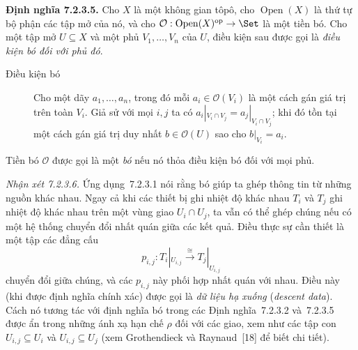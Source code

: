 \noindent\textbf{Định nghĩa 7.2.3.5.}\keepwithnext
Cho $X$ là một không gian tôpô, cho $\operatorname{Open}(X)$ là thứ tự bộ phận các tập mở của nó, và cho $\mathcal O:\operatorname{Open}(X)^{\mathrm{op}}\to\Set$ là một tiền bó. Cho một tập mở $U\subseteq X$ và một phủ $V_1,\ldots,V_n$ của $U$, điều kiện sau được gọi là \emph{điều kiện bó đối với phủ đó}.
\begin{description}
\item[Điều kiện bó] Cho một dãy $a_1,\ldots,a_n$, trong đó mỗi $a_i\in\mathcal O(V_i)$ là một cách gán giá trị trên toàn $V_i$. Giả sử với mọi $i,j$ ta có $a_i|_{V_i\cap V_j}=a_j|_{V_i\cap V_j}$; khi đó tồn tại một cách gán giá trị duy nhất $b\in\mathcal O(U)$ sao cho $b|_{V_i}=a_i$.
\end{description}
Tiền bó $\mathcal O$ được gọi là một \emph{bó} nếu nó thỏa điều kiện bó đối với mọi phủ.

\noindent\textit{Nhận xét 7.2.3.6.}\keepwithnext
Ứng dụng~7.2.3.1 nói rằng bó giúp ta ghép thông tin từ những nguồn khác nhau. Ngay cả khi các thiết bị ghi nhiệt độ khác nhau $T_i$ và $T_j$ ghi nhiệt độ khác nhau trên một vùng giao $U_i\cap U_j$, ta vẫn có thể ghép chúng nếu có một hệ thống chuyển đổi nhất quán giữa các kết quả. Điều thực sự
cần thiết là một tập các đẳng cấu
\[
p_{i,j}:T_i|_{U_{i,j}}\xrightarrow{\cong}T_j|_{U_{i,j}}
\]
chuyển đổi giữa chúng, và các $p_{i,j}$ này phối hợp nhất quán với nhau. Điều này (khi được định nghĩa chính xác) được gọi là \emph{dữ liệu hạ xuống} (\emph{descent data}). Cách nó tương tác với định nghĩa bó trong các Định nghĩa~7.2.3.2 và~7.2.3.5 được ẩn trong những ánh xạ hạn chế $\rho$ đối với các giao, xem như các tập con $U_{i,j}\subseteq U_i$ và $U_{i,j}\subseteq U_j$ (xem Grothendieck và Raynaud~[18] để biết chi tiết).

